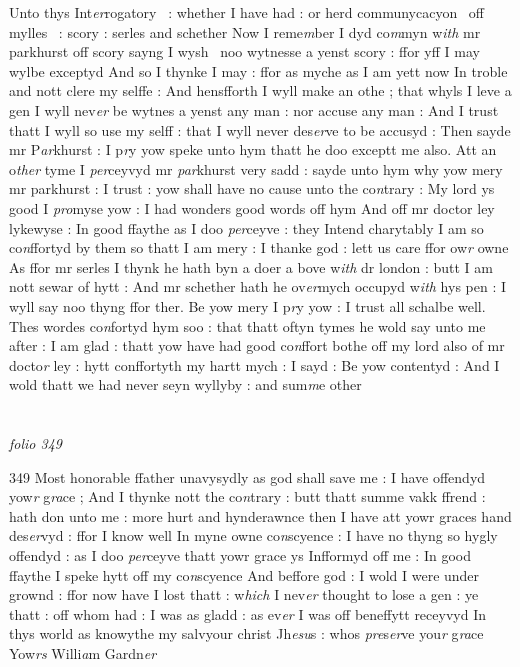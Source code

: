\documentclass[12pt, a4paper]{book}
\begin{document}
Unto thys Int\textit{er}rogatory  : whether  I have had : or herd communycacyon  off mylles  : scory : serles and schether  Now I reme\textit{m}ber I dyd co\textit{m}myn w\textit{ith} mr parkhurst off scory sayng I wysh  noo wytnesse a yenst scory : ffor yff I may wylbe exceptyd And so I thynke I may : ffor as myche as I am yett now In troble and nott clere my selffe : And hensfforth I wyll make  an othe ; that whyls I leve a gen I wyll nev\textit{er} be wytnes  a yenst any man : nor accuse any man : And I trust  thatt I wyll so use my selff : that I wyll never des\textit{er}ve to be accusyd : Then sayde mr P\textit{ar}khurst : I p\textit{r}y yow speke  unto hym thatt he doo exceptt me also.   Att an o\textit{ther} tyme I \textit{per}ceyvyd mr \textit{par}khurst very sadd : sayde unto hym why yow mery mr parkhurst : I trust : yow shall have no cause unto the co\textit{n}trary : My lord ys good I \textit{pro}myse yow : I had wonders good words  off hym And off mr doctor ley lykewyse : In good ffaythe as I doo  \textit{per}ceyve : they Intend charytably I am so co\textit{n}ffortyd by them so  thatt I am mery : I thanke god : lett us care ffor ow\textit{r} owne As ffor mr serles I thynk he hath byn a doer a bove w\textit{ith} dr  london : butt I am nott sewar of hytt : And mr schether hath he  ov\textit{er}mych occupyd w\textit{ith} hys pen : I wyll say noo thyng ffor ther. Be yow mery I p\textit{r}y yow : I trust all schalbe well. Thes wordes co\textit{n}fortyd hym soo : that thatt oftyn tymes he wold say unto me after : I am glad : thatt yow have had good co\textit{n}ffort bothe off my lord also of mr docto\textit{r} ley : hytt conffortyth my hartt mych : I sayd : Be yow contentyd : And I wold thatt we had never  seyn wyllyby : and sum\textit{m}e other

\dotfill
					  \section*{}

\textit{folio 349}



{\color{Mahogany}349} Most honorable ffather unavysydly as god shall save  me : I have offendyd yow\textit{r} g\textit{ra}ce ; And I thynke nott the co\textit{n}trary : butt thatt summe vakk ffrend : hath don unto me : more hurt and hynderawnce then I have att yowr graces hand des\textit{er}vyd : ffor I know well In myne owne co\textit{n}scyence : I have  no thyng so hygly offendyd : as I doo \textit{per}ceyve thatt yowr grace ys Infformyd off me : In good  ffaythe I speke hytt off my co\textit{n}scyence And beffore god : I wold I were under grownd : ffor now have I lost thatt : w\textit{hich} I nev\textit{er} thought to lose a gen : ye thatt : off whom had : I was as  gladd : as ev\textit{er} I was off beneffytt receyvyd In thys world as knowythe my salvyour christ Jh\textit{esu}s : whos \textit{pre}s\textit{er}ve you\textit{r} g\textit{ra}ce  Yow\textit{rs} Willi\textit{a}m  Gardn\textit{er}
               
\end{document}
